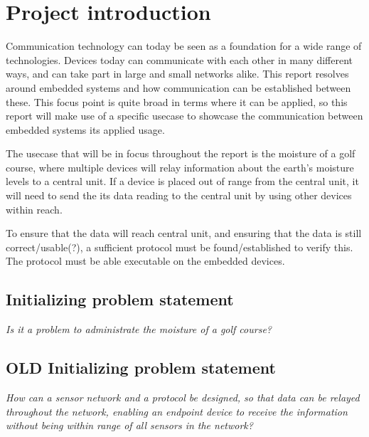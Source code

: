 \chapter{Project introduction}
Communication technology can today be seen as a foundation for a wide range of technologies. Devices today can communicate with each other in many different ways, and can take part in large and small networks alike.
%
This report resolves around embedded systems and how communication can be established between these. This focus point is quite broad in terms where it can be applied, so this report will make use of a specific usecase to showcase the communication between embedded systems its applied usage.

The usecase that will be in focus throughout the report is the moisture of a golf course, where multiple devices will relay information about the earth's moisture levels to a central unit. If a device is placed out of range from the central unit, it will need to send the its data reading to the central unit by using other devices within reach.

To ensure that the data will reach central unit, and ensuring that the data is still correct/usable(?), a sufficient protocol must be found/established to verify this. The protocol must be able executable on the embedded devices.

\section{Initializing problem statement}

\textit{Is it a problem to administrate the moisture of a golf course?}

\section{OLD Initializing problem statement}

\textit{How can a sensor network and a protocol be designed, so that data can be relayed throughout the network, enabling an endpoint device to receive the information without being within range of all sensors in the network?}
